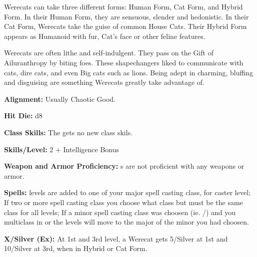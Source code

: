 
Werecats can take three different forms: Human Form, Cat Form, and Hybrid Form. In their Human Form, they are sensuous, slender and hedonistic. In their Cat Form, Werecats take the guise of common House Cats. Their Hybrid Form appears as Humanoid with fur, Cat's face or other feline features.

Werecats are often lithe and self-indulgent. They pass on the Gift of Ailuranthropy by biting foes. These shapechangers liked to communicate with cats, dire cats, and even Big cats such as lions. Being adept in charming, bluffing and disguising are something Werecats greatly take advantage of.

\textbf{Alignment:} Usually Chaotic Good.

\textbf{Hit Die:} d8

\textbf{Class Skills:} The \currentclassname{} gets no new class skils.

\textbf{Skills/Level:} 2 + Intelligence Bonus

\modebab{}
\poorfor{}
\goodref{}
\poorwil{}

\begin{classtable}
\end{classtable}

\classfeatures

\textbf{Weapon and Armor Proficiency:} \currentclassname{}s are not proficient with any weapons or armor.

\textbf{Spells:} \currentclassname{} levels are added to one of your major spell casting class, for caster level; If two or more spell casting class you choose what class but must be the same class for all \currentclassname{} levels; If a minor spell casting class was choosen (ie. /) and you multiclass in  or  the \currentclassname{} levels will move to the major of the minor you had choosen.

\textbf{ X/Silver (Ex):} At 1st and 3rd level, a Werecat gets  5/Silver at 1st and 10/Silver at 3rd, when in Hybrid or Cat Form.

